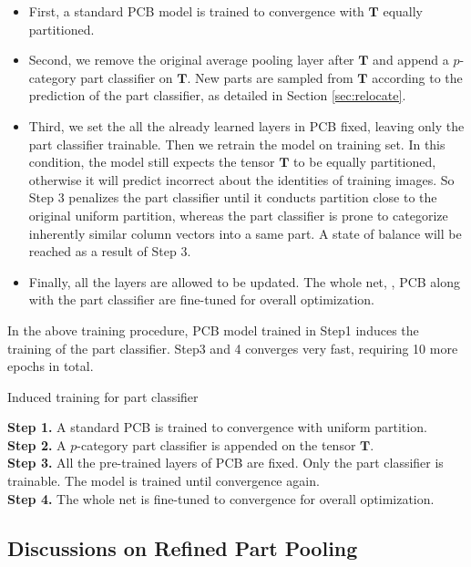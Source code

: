 \documentclass[10pt,twocolumn,letterpaper]{article}
\begin{document}
\begin{itemize}
\item First, a standard PCB model is trained to convergence with $\bm T$ equally partitioned. 
\item Second, we remove the original average pooling layer after $\bm T$ and append a $p$-category part classifier on $\bm T$. New parts are sampled from $\bm T$ according to the prediction of the part classifier, as detailed in Section \ref{sec:relocate}.
\item Third, we set the all the already learned layers in PCB fixed, leaving only the part classifier trainable. Then we retrain the model on training set. In this condition, the model still expects the tensor $\bm T$ to be equally partitioned, otherwise it will predict incorrect about the identities of training images. So Step 3 penalizes the part classifier until it conducts partition close to the original uniform partition, whereas the part classifier is prone to categorize inherently similar column vectors into a same part. A state of balance will be reached as a result of Step 3. 
\item Finally, all the layers are allowed to be updated. The whole net, \ie, PCB along with the part classifier are fine-tuned for overall optimization.
\end{itemize}

In the above training procedure, PCB model trained in Step1 induces the training of the part classifier. Step3 and 4 converges very fast, requiring 10 more epochs in total.

\begin{algorithm}
\caption{Induced training for part classifier}
\textbf{Step 1.} A standard PCB is trained to convergence with uniform partition.\\
\textbf{Step 2.} A $p$-category part classifier is appended on the tensor $\bm T$. \\
\textbf{Step 3.} All the pre-trained layers of PCB are fixed. Only the part classifier is trainable. The model is trained until convergence again.\\
\textbf{Step 4.} The whole net is fine-tuned to convergence for overall optimization.\\
\label{alg:induction}
\end{algorithm}

\subsection{Discussions on Refined Part Pooling}
\end{document}

